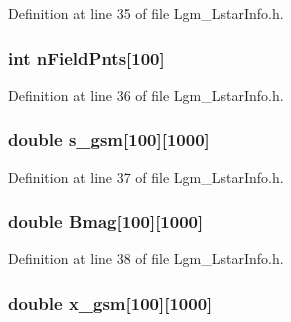 Definition at line 35 of file Lgm\_\-LstarInfo.h.\hypertarget{struct_lgm___lstar_info_09227be97e257b54115370b3a6a7068d}{
\subsubsection[{nFieldPnts}]{\setlength{\rightskip}{0pt plus 5cm}int {\bf nFieldPnts}\mbox{[}100\mbox{]}}}
\label{struct_lgm___lstar_info_09227be97e257b54115370b3a6a7068d}




Definition at line 36 of file Lgm\_\-LstarInfo.h.\hypertarget{struct_lgm___lstar_info_1afc9fdd1806999a43e3c0ca0e6f7439}{
\subsubsection[{s\_\-gsm}]{\setlength{\rightskip}{0pt plus 5cm}double {\bf s\_\-gsm}\mbox{[}100\mbox{]}\mbox{[}1000\mbox{]}}}
\label{struct_lgm___lstar_info_1afc9fdd1806999a43e3c0ca0e6f7439}




Definition at line 37 of file Lgm\_\-LstarInfo.h.\hypertarget{struct_lgm___lstar_info_7863fc2c379717c21a5bb5e3f217a74b}{
\subsubsection[{Bmag}]{\setlength{\rightskip}{0pt plus 5cm}double {\bf Bmag}\mbox{[}100\mbox{]}\mbox{[}1000\mbox{]}}}
\label{struct_lgm___lstar_info_7863fc2c379717c21a5bb5e3f217a74b}




Definition at line 38 of file Lgm\_\-LstarInfo.h.\hypertarget{struct_lgm___lstar_info_fc2724b1c578713a685b87b9e12ea4b0}{
\subsubsection[{x\_\-gsm}]{\setlength{\rightskip}{0pt plus 5cm}double {\bf x\_\-gsm}\mbox{[}100\mbox{]}\mbox{[}1000\mbox{]}}}
\label{struct_lgm___lstar_info_fc2724b1c578713a685b87b9e12ea4b0}





